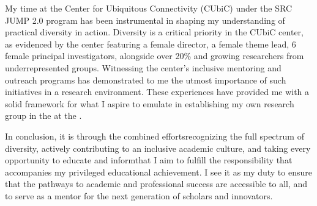 My time at the Center for Ubiquitous Connectivity (CUbiC) under the SRC JUMP 2.0 program has been instrumental in shaping my understanding of practical diversity in action. Diversity is a critical priority in the CUbiC center, as evidenced by the center featuring a female director, a female theme lead, 6 female principal investigators, alongside over 20\% and growing researchers from underrepresented groups. Witnessing the center's inclusive mentoring and outreach programs has demonstrated to me the utmost importance of such initiatives in a research environment. These experiences have provided me with a solid framework for what I aspire to emulate in establishing my own research group in the \appDept{} at the \appSchool{}.

In conclusion, it is through the combined efforts\textemdash recognizing the full spectrum of diversity, actively contributing to an inclusive academic culture, and taking every opportunity to educate and inform\textemdash that I aim to fulfill the responsibility that accompanies my privileged educational achievement. I see it as my duty to ensure that the pathways to academic and professional success are accessible to all, and to serve as a mentor for the next generation of scholars and innovators.


